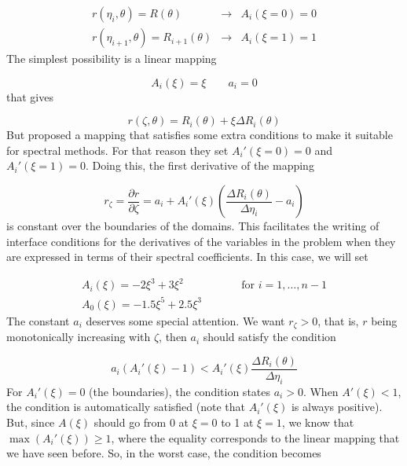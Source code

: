 \begin{eqnarray*}
r(\eta_i,\theta)=R(\theta) &\longrightarrow& A_i(\xi=0)=0\\
r(\eta_{i+1},\theta)=R_{i+1}(\theta) &\longrightarrow& A_i(\xi=1)=1
\end{eqnarray*}
The simplest possibility is a linear mapping

\begin{equation}
A_i(\xi)=\xi \qquad a_i=0
\end{equation}
that gives

\begin{equation}
\label{eq:map_linear}
r(\zeta,\theta)=R_i(\theta)+\xi\Delta R_i(\theta)
\end{equation}
But \citet{BGM98} proposed a mapping that satisfies some
extra conditions to make it suitable for spectral methods. For that
reason they set $A_i'(\xi=0)=0$ and $A_i'(\xi=1)=0$. Doing this, the
first derivative of the mapping

\begin{equation}
r_\zeta=\frac{\partial r}{\partial\zeta}=a_i+A_i'(\xi)\left(\frac{\Delta R_i(\theta)}{\Delta\eta_i}-a_i\right)
\end{equation}
is constant over the boundaries of the domains. This facilitates the
writing of interface conditions for the derivatives of the variables
in the problem when they are expressed in terms of their spectral
coefficients.  In this case, we will set

\begin{eqnarray}
\label{eq:map_bonazzola}
A_i(\xi)=-2\xi^3+3\xi^2 &\qquad& \mbox{for $i=1,\ldots,n-1$}\\
A_0(\xi)=-1.5\xi^5+2.5\xi^3&&
\end{eqnarray}
The constant $a_i$ deserves some special attention. We want $r_\zeta>0$,
that is, $r$ being monotonically increasing with $\zeta$, then $a_i$
should satisfy the condition

\begin{equation}
a_i(A_i'(\xi)-1)<A_i'(\xi)\frac{\Delta R_i(\theta)}{\Delta\eta_i}
\end{equation}
For $A_i'(\xi)=0$ (the boundaries), the condition states $a_i>0$.
When $A'(\xi)<1$, the condition is automatically satisfied (note that
$A_i'(\xi)$ is always positive).  But, since $A(\xi)$ should go from 0 at
$\xi=0$ to 1 at $\xi=1$, we know that $\max(A_i'(\xi))\ge1$, where the
equality corresponds to the linear mapping that we have seen before. So,
in the worst case, the condition becomes

